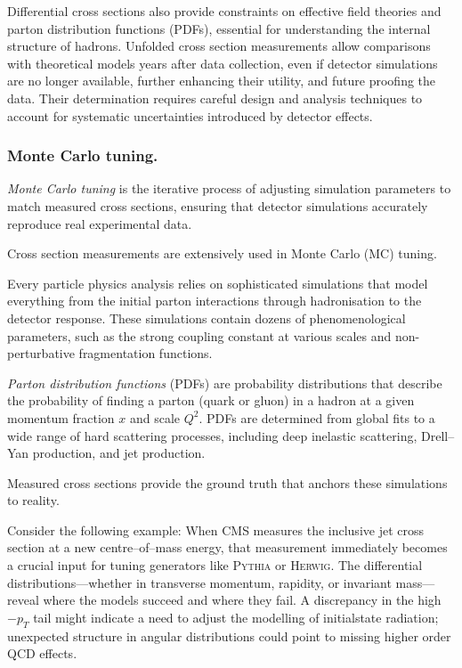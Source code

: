             Differential cross sections also provide constraints on effective field theories and parton distribution functions (PDFs), essential for understanding the internal structure of hadrons.
            Unfolded cross section measurements allow comparisons with theoretical models years after data collection, even if detector simulations are no longer available, further enhancing their utility, and future proofing the data.
            Their determination requires careful design and analysis techniques to account for systematic uncertainties introduced by detector effects.

        \subsubsection{Monte Carlo tuning.}
            \begin{definition}
                \emph{Monte Carlo tuning} is the iterative process of adjusting simulation parameters to match measured cross sections, ensuring that detector simulations accurately reproduce real experimental data.
            \end{definition}
            Cross section measurements are extensively used in Monte Carlo (MC) tuning.
            
            Every particle physics analysis relies on sophisticated simulations that model everything from the initial parton interactions through hadronisation to the detector response.
            These simulations contain dozens of phenomenological parameters, such as the strong coupling constant at various scales and non-perturbative fragmentation functions.
            \begin{definition}
                \emph{Parton distribution functions} (PDFs) are probability distributions that describe the probability of finding a parton (quark or gluon) in a hadron at a given momentum fraction \(x\) and scale \(Q^2\).
                PDFs are determined from global fits to a wide range of hard scattering processes, including deep inelastic scattering, Drell--Yan production, and jet production.
            \end{definition}
            Measured cross sections provide the ground truth that anchors these simulations to reality.

            Consider the following example:
            When CMS measures the inclusive jet cross section at a new centre--of--mass energy, that measurement immediately becomes a crucial input for tuning generators like \textsc{Pythia} or \textsc{Herwig}.
            The differential distributions---whether in transverse momentum, rapidity, or invariant mass---reveal where the models succeed and where they fail.
            A discrepancy in the high\(-p_T\) tail might indicate a need to adjust the modelling of initialstate radiation; unexpected structure in angular distributions could point to missing higher order QCD effects.
